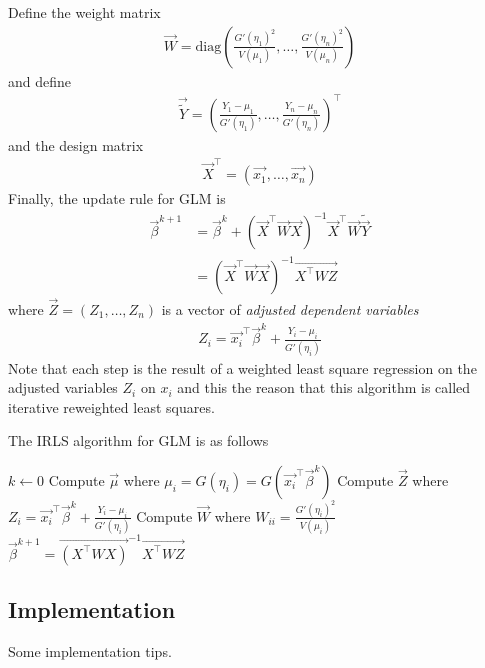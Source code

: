 Define the weight matrix
\begin{align*}
\vec{W} = \text{diag}\left( \frac{G'(\eta_{1})^2}{V(\mu_{1})}, \dots, \frac{G'(\eta_{n})^2}{V(\mu_{n})} \right)
\end{align*}
and define
\begin{align*}
\vec{\tilde{Y}} = \left(\frac{Y_1 - \mu_1}{G'(\eta_{1})}, \dots, \frac{Y_n - \mu_{n}}{G'(\eta_{n})}\right)^\top
\end{align*}
and the design matrix
\begin{align*}
\vec{X}^\top = \left(\vec{x_1}, \dots, \vec{x_n}\right)
\end{align*}
Finally, the update rule for GLM is
\begin{align*}
\vec{\beta}^{k+1}  &= \vec{\beta}^{k} + (\vec{X}^\top \vec{W} \vec{X})^{-1}\vec{X}^\top \vec{W}\tilde{\vec{Y}} \\
&= (\vec{X}^\top \vec{W} \vec{X})^{-1}\vec{X^\top WZ}
\end{align*}
where  $\vec{Z} = (Z_1, \dots, Z_n)$ is a vector of \emph{adjusted dependent variables}
\begin{align*}
Z_i = \vec{x_i}^\top \vec{\beta}^{k} + \frac{Y_i - \mu_{i}}{G'(\eta_{i})}
\end{align*}
Note that each step is the result of a weighted least square regression on the adjusted variables $Z_i$ on $x_i$ and this the reason that this algorithm is called iterative reweighted least squares.

The IRLS algorithm for GLM is as follows
\begin{algorithm}
\begin{algorithmic}[1]
    \State $k \leftarrow 0$
    \Repeat
        \State Compute $\vec{\mu}$ where $\mu_{i} = G(\eta_{i}) = G(\vec{x_i}^\top \vec{\beta}^{k})$
        \State Compute $\vec{Z}$ where $Z_i = \vec{x_i}^\top \vec{\beta}^{k} + \frac{Y_i - \mu_{i}}{G'(\eta_{i})}$
        \State Compute $\vec{W}$ where $W_{ii} = \frac{G'(\eta_{i})^2}{V(\mu_{i})}$
        \State $\vec{\beta}^{k+1} = \vec{(X^\top W X)}^{-1} \vec{X^\top WZ}$
\end{algorithmic}
\label{alg:IRLS}
\end{algorithm}

\subsection{Implementation}
Some implementation tips.
